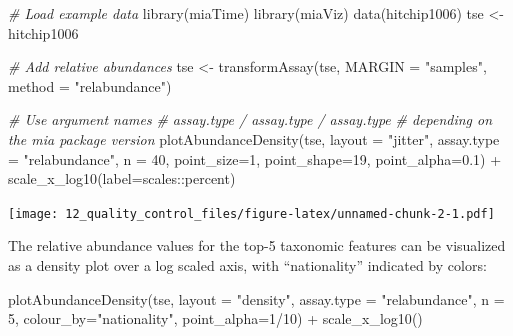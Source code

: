 \documentclass[
]{book}
\newenvironment{Shaded}{\begin{snugshade}}{\end{snugshade}}
\newcommand{\AttributeTok}[1]{\textcolor[rgb]{0.77,0.63,0.00}{#1}}
\newcommand{\CommentTok}[1]{\textcolor[rgb]{0.56,0.35,0.01}{\textit{#1}}}
\newcommand{\DecValTok}[1]{\textcolor[rgb]{0.00,0.00,0.81}{#1}}
\newcommand{\FloatTok}[1]{\textcolor[rgb]{0.00,0.00,0.81}{#1}}
\newcommand{\FunctionTok}[1]{\textcolor[rgb]{0.00,0.00,0.00}{#1}}
\newcommand{\NormalTok}[1]{#1}
\newcommand{\OtherTok}[1]{\textcolor[rgb]{0.56,0.35,0.01}{#1}}
\newcommand{\SpecialCharTok}[1]{\textcolor[rgb]{0.00,0.00,0.00}{#1}}
\newcommand{\StringTok}[1]{\textcolor[rgb]{0.31,0.60,0.02}{#1}}
\begin{document}
\begin{Shaded}
\begin{Highlighting}[]
\CommentTok{\# Load example data}
\FunctionTok{library}\NormalTok{(miaTime)}
\FunctionTok{library}\NormalTok{(miaViz)}
\FunctionTok{data}\NormalTok{(hitchip1006)}
\NormalTok{tse }\OtherTok{\textless{}{-}}\NormalTok{ hitchip1006}

\CommentTok{\# Add relative abundances}
\NormalTok{tse }\OtherTok{\textless{}{-}} \FunctionTok{transformAssay}\NormalTok{(tse, }\AttributeTok{MARGIN =} \StringTok{"samples"}\NormalTok{, }\AttributeTok{method =} \StringTok{"relabundance"}\NormalTok{)}

\CommentTok{\# Use argument names}
\CommentTok{\# assay.type / assay.type / assay.type}
\CommentTok{\# depending on the mia package version}
\FunctionTok{plotAbundanceDensity}\NormalTok{(tse, }\AttributeTok{layout =} \StringTok{"jitter"}\NormalTok{, }\AttributeTok{assay.type =} \StringTok{"relabundance"}\NormalTok{,}
                     \AttributeTok{n =} \DecValTok{40}\NormalTok{, }\AttributeTok{point\_size=}\DecValTok{1}\NormalTok{, }\AttributeTok{point\_shape=}\DecValTok{19}\NormalTok{, }\AttributeTok{point\_alpha=}\FloatTok{0.1}\NormalTok{) }\SpecialCharTok{+} 
                     \FunctionTok{scale\_x\_log10}\NormalTok{(}\AttributeTok{label=}\NormalTok{scales}\SpecialCharTok{::}\NormalTok{percent)}
\end{Highlighting}
\end{Shaded}

\texttt{[image: 12\_quality\_control\_files/figure-latex/unnamed-chunk-2-1.pdf]}

The relative abundance values for the top-5 taxonomic features can be
visualized as a density plot over a log scaled axis, with
``nationality'' indicated by colors:

\begin{Shaded}
\begin{Highlighting}[]
\FunctionTok{plotAbundanceDensity}\NormalTok{(tse, }\AttributeTok{layout =} \StringTok{"density"}\NormalTok{, }\AttributeTok{assay.type =} \StringTok{"relabundance"}\NormalTok{,}
                     \AttributeTok{n =} \DecValTok{5}\NormalTok{, }\AttributeTok{colour\_by=}\StringTok{"nationality"}\NormalTok{, }\AttributeTok{point\_alpha=}\DecValTok{1}\SpecialCharTok{/}\DecValTok{10}\NormalTok{) }\SpecialCharTok{+}
    \FunctionTok{scale\_x\_log10}\NormalTok{()}
\end{Highlighting}
\end{Shaded}
\end{document}
